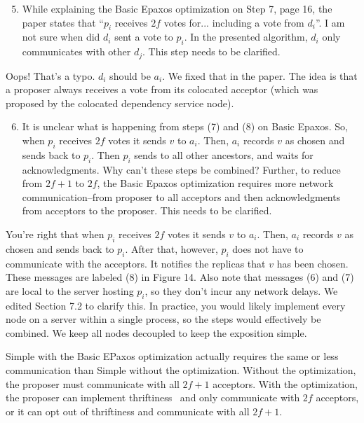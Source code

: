 \documentclass[letterpaper,twocolumn,10pt]{article}
\newenvironment{reviewerquote}
{\list{}{\leftmargin=\parindent\rightmargin=0in}\item[] \itshape \color{ReviewerDarkGray}}%
{\endlist}
\begin{document}
\begin{reviewerquote}
  \begin{enumerate}
    \setcounter{enumi}{4}
    \item
      While explaining the Basic Epaxos optimization on Step 7, page 16, the
      paper states that ``$p_i$ receives $2f$ votes for... including a vote
      from $d_i$''.  I am not sure when did $d_i$ sent a vote to $p_i$. In the
      presented algorithm, $d_i$ only communicates with other $d_j$. This step
      needs to be clarified.
  \end{enumerate}
\end{reviewerquote}

Oops! That's a typo. $d_i$ should be $a_i$. We fixed that in the paper. The
idea is that a proposer always receives a vote from its colocated acceptor
(which was proposed by the colocated dependency service node).

\begin{reviewerquote}
  \begin{enumerate}
    \setcounter{enumi}{5}
    \item
      It is unclear what is happening from steps (7) and (8) on Basic Epaxos.
      So, when $p_i$ receives $2f$ votes it sends $v$ to $a_i$. Then, $a_i$
      records $v$ as chosen and sends back to $p_i$. Then $p_i$ sends to all
      other ancestors, and waits for acknowledgments. Why can't these steps be
      combined? Further, to reduce from $2f+1$ to $2f$, the Basic Epaxos
      optimization requires more network communication--from proposer to all
      acceptors and then acknowledgments from acceptors to the proposer. This
      needs to be clarified.
  \end{enumerate}
\end{reviewerquote}

You're right that when $p_i$ receives $2f$ votes it sends $v$ to $a_i$. Then,
$a_i$ records $v$ as chosen and sends back to $p_i$. After that, however, $p_i$
does not have to communicate with the acceptors. It notifies the replicas that
$v$ has been chosen. These messages are labeled (8) in Figure 14. Also note
that messages (6) and (7) are local to the server hosting $p_i$, so they don't
incur any network delays. We edited Section 7.2 to clarify this. In practice,
you would likely implement every node on a server within a single process, so
the steps would effectively be combined. We keep all nodes decoupled to keep
the exposition simple.

Simple \BPaxos{} with the Basic EPaxos optimization actually requires the same
or less communication than Simple \BPaxos{} without the optimization. Without
the optimization, the proposer must communicate with all $2f+1$ acceptors. With
the optimization, the proposer can implement thriftiness~\cite{moraru2013there}
and only communicate with $2f$ acceptors, or it can opt out of thriftiness and
communicate with all $2f+1$.
\end{document}
